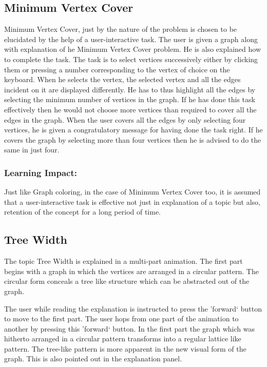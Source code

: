 \subsection{Minimum Vertex Cover}
Minimum Vertex Cover, just by the nature of the problem is chosen to be
elucidated by the help of a user-interactive task. The user is given a graph
along with explanation of he Minimum Vertex Cover problem. He is also explained
how to complete the task. The task is to select vertices successively either by
clicking them or pressing a number corresponding to the vertex of choice on the
keyboard.  When he selects the vertex, the selected vertex and all the edges
incident on it are displayed differently. He has to thus highlight all the
edges by selecting the minimum number of vertices in the graph.  If he has done
this task effectively then he would not choose more vertices than required to
cover all the edges in the graph. When the user covers all the edges by only
selecting four vertices, he is given a congratulatory message for having done
the task right. If he covers the graph by selecting more than four vertices
then he is advised to do the same in just four.

\subsubsection{Learning Impact:}
Just like Graph coloring, in the case of Minimum Vertex Cover too, it is
assumed that a user-interactive task is effective not just in explanation of a
topic but also, retention of the concept for a long period of time.

\subsection{Tree Width}
The topic Tree Width is explained in a multi-part animation. The first part
begins with a graph in which the vertices are arranged in a circular pattern.
The circular form conceals a tree like structure which can be abstracted out of
the graph. 

The user while reading the explanation is instructed to press the 'forward`
button to move to the first part. The user hops from one part of the animation
to another by pressing this 'forward` button.  In the first part the graph
which was hitherto arranged in a circular pattern transforms into a regular
lattice like pattern. The tree-like pattern is more apparent in the new visual
form of the graph.  This is also pointed out in the explanation panel.  

